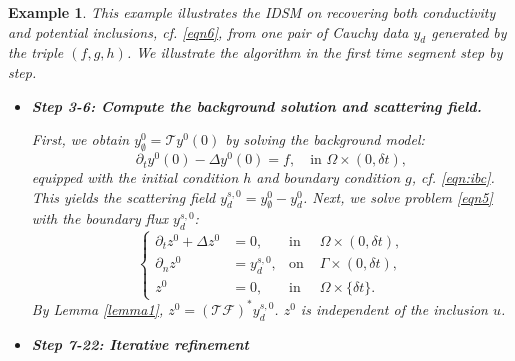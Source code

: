 \documentclass[onefignum,onetabnum]{siamart190516}
\newtheorem{example}{Example}[section]
\numberwithin{equation}{section}
\begin{document}
\begin{example}
This example illustrates the IDSM on recovering both conductivity and potential inclusions, cf. \eqref{eqn6}, from one pair of Cauchy data $y_{d}$ generated by the triple $(f, g, h)$. We illustrate the algorithm in the first time segment step by step.

\begin{itemize}
\item \textbf{Step 3-6: Compute the background solution and scattering field.}

First, we obtain $y_{\emptyset}^0 = \mathcal{T} y^0(0)$ by solving the background model:
\begin{equation*}
\partial_{t} y^{0}(0) - \Delta y^{0}(0) = f, \quad \text{in }\Omega \times (0, \delta t),
\end{equation*}
equipped with the initial condition $h$ and boundary condition $g$, cf. \eqref{eqn:ibc}.
This yields the scattering field $y_{d}^{s,0} = y_{\emptyset}^0 - y_{d}^0$.
Next, we solve problem \eqref{eqn5} with the boundary flux $y_{d}^{s,0}$:
\begin{equation*}
\left\{
\begin{aligned}
\partial_{t} z^{0} + \Delta z^{0} &= 0, & \text{in }& \Omega \times (0, \delta t), \\
{\partial_n} z^{0} &= y_{d}^{s,0}, & \text{on }& \Gamma \times (0, \delta t), \\
z^{0} &= 0, & \text{in }& \Omega \times \{\delta t\}.
\end{aligned}\right.
\end{equation*}
By Lemma \ref{lemma1}, $z^0 = (\mathcal{T}\mathcal{F})^* y_{d}^{s,0}$.
$z^0$ is independent of the inclusion $u$.

\item \textbf{Step 7-22: Iterative refinement}


\end{itemize}
\end{example}
\end{document}
